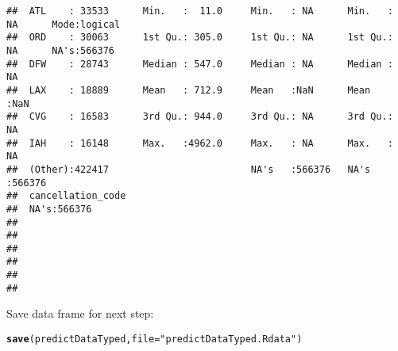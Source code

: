 \documentclass{article}\usepackage[]{graphicx}\usepackage[]{color}
\makeatletter
\newcommand{\hlstr}[1]{\textcolor[rgb]{0.192,0.494,0.8}{#1}}%
\newcommand{\hlstd}[1]{\textcolor[rgb]{0.345,0.345,0.345}{#1}}%
\newcommand{\hlkwc}[1]{\textcolor[rgb]{0.333,0.667,0.333}{#1}}%
\newcommand{\hlkwd}[1]{\textcolor[rgb]{0.737,0.353,0.396}{\textbf{#1}}}%
\newenvironment{kframe}{%
 \def\at@end@of@kframe{}%
 \ifinner\ifhmode%
  \def\at@end@of@kframe{\end{minipage}}%
  \begin{minipage}{\columnwidth}%
 \fi\fi%
 \def\FrameCommand##1{\hskip\@totalleftmargin \hskip-\fboxsep
 \colorbox{shadecolor}{##1}\hskip-\fboxsep
     \hskip-\linewidth \hskip-\@totalleftmargin \hskip\columnwidth}%
 \MakeFramed {\advance\hsize-\width
   \@totalleftmargin\z@ \linewidth\hsize
   \@setminipage}}%
 {\par\unskip\endMakeFramed%
 \at@end@of@kframe}
\newenvironment{knitrout}{}{} %
\makeatother
\begin{document}
\begin{knitrout}
\begin{kframe}
\begin{verbatim}
##  ATL    : 33533      Min.   :  11.0     Min.   : NA      Min.   : NA      Mode:logical  
##  ORD    : 30063      1st Qu.: 305.0     1st Qu.: NA      1st Qu.: NA      NA's:566376   
##  DFW    : 28743      Median : 547.0     Median : NA      Median : NA                    
##  LAX    : 18889      Mean   : 712.9     Mean   :NaN      Mean   :NaN                    
##  CVG    : 16583      3rd Qu.: 944.0     3rd Qu.: NA      3rd Qu.: NA                    
##  IAH    : 16148      Max.   :4962.0     Max.   : NA      Max.   : NA                    
##  (Other):422417                         NA's   :566376   NA's   :566376                 
##  cancellation_code
##  NA's:566376      
##                   
##                   
##                   
##                   
##                   
## 
\end{verbatim}
\end{kframe}
\end{knitrout}

Save data frame for next step:
\begin{knitrout}
\color{fgcolor}\begin{kframe}
\begin{alltt}
\hlkwd{save}\hlstd{(predictDataTyped,} \hlkwc{file}\hlstd{=}\hlstr{"predictDataTyped.Rdata"}\hlstd{)}
\end{alltt}
\end{kframe}
\end{knitrout}
\end{document}
